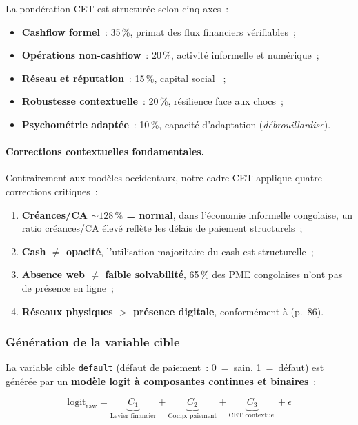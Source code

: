 \documentclass[12pt, a4paper, twocolumn]{article}
\begin{document}
La pondération CET est structurée selon cinq axes~:
\begin{itemize}[leftmargin=*]
  \item \textbf{Cashflow formel}~: 35\,\%, primat des flux financiers vérifiables~;
  \item \textbf{Opérations non-cashflow}~: 20\,\%, activité informelle et numérique~;
  \item \textbf{Réseau et réputation}~: 15\,\%, capital social \cite{guerin2015}~;
  \item \textbf{Robustesse contextuelle}~: 20\,\%, résilience face aux chocs~;
  \item \textbf{Psychométrie adaptée}~: 10\,\%, capacité d'adaptation (\textit{débrouillardise}).
\end{itemize}

\paragraph{Corrections contextuelles fondamentales.}
Contrairement aux modèles occidentaux, notre cadre CET applique quatre corrections critiques~:
\begin{enumerate}[leftmargin=*]
  \item \textbf{Créances/CA ${\sim}128\,\%$ = normal}, dans l'économie informelle congolaise, un ratio créances/CA élevé reflète les délais de paiement structurels~;
  \item \textbf{Cash $\neq$ opacité}, l'utilisation majoritaire du cash est structurelle~;
  \item \textbf{Absence web $\neq$ faible solvabilité}, 65\,\% des PME congolaises n'ont pas de présence en ligne~;
  \item \textbf{Réseaux physiques $>$ présence digitale}, conformément à \cite{guerin2015} (p.~86).
\end{enumerate}

\subsubsection{Génération de la variable cible}
\label{subsubsec:cible}

La variable cible \texttt{default} (défaut de paiement~: 0~=~sain, 1~=~défaut) est générée par un \textbf{modèle logit à composantes continues et binaires}~:

\begin{equation}
\label{eq:logit}
  \text{logit}_{\text{raw}} = \underbrace{C_1}_{\text{Levier financier}} + \underbrace{C_2}_{\text{Comp.\ paiement}} + \underbrace{C_3}_{\text{CET contextuel}} + \epsilon
\end{equation}
\end{document}
